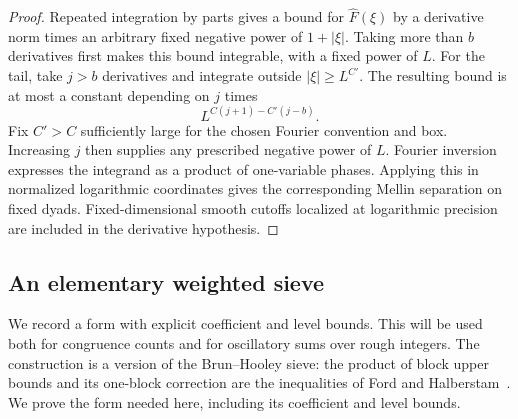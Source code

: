 \begin{proof}
Repeated integration by parts gives a bound for $\widehat F(\xi)$
by a derivative norm times an arbitrary fixed negative power of
$1+|\xi|$. Taking more than $b$ derivatives first makes this bound
integrable, with a fixed power of $L$. For the tail, take $j>b$
derivatives and integrate outside $|\xi|\ge L^{C'}$. The resulting
bound is at most a constant depending on $j$ times
\[
 L^{C(j+1)-C'(j-b)}.
\]
Fix $C'>C$ sufficiently large for the chosen Fourier convention and
box. Increasing $j$ then supplies any prescribed negative power of
$L$. Fourier inversion expresses the integrand as a product of
one-variable phases. Applying this in normalized logarithmic
coordinates gives the corresponding Mellin separation on fixed
dyads. Fixed-dimensional smooth cutoffs localized at logarithmic
precision are included in the derivative hypothesis.
\end{proof}

\subsection{An elementary weighted sieve}

We record a form with explicit coefficient and level bounds. This
will be used both for congruence counts and for oscillatory sums over
rough integers.
The construction is a version of the Brun--Hooley sieve: the product
of block upper bounds and its one-block correction are the inequalities
of Ford and Halberstam~\cite[Section~1, Lemma~1]{FordHalberstam2000}.
We prove the form needed here, including its coefficient and level bounds.

